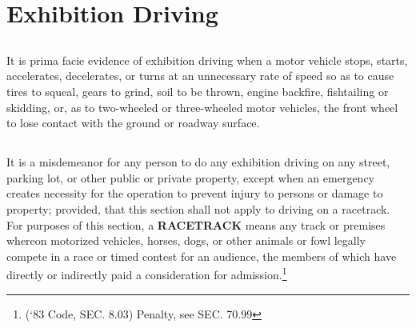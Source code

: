 \section{Exhibition Driving}
\subsection{}
It is prima facie evidence of exhibition driving when a motor vehicle stops, starts, accelerates, decelerates, or turns at an unnecessary rate of speed so as to cause tires to squeal, gears to grind, soil to be thrown, engine backfire, fishtailing or skidding, or, as to two-wheeled or three-wheeled motor vehicles, the front wheel to lose contact with the ground or roadway surface.
\subsection{}
It is a misdemeanor for any person to do any exhibition driving on any street, parking lot, or other public or private property, except when an emergency creates necessity for the operation to prevent injury to persons or damage to property; provided, that this section shall not apply to driving on a racetrack.  For purposes of this section, a \textbf{RACETRACK} means any track or premises whereon motorized vehicles, horses, dogs, or other animals or fowl legally compete in a race or timed contest for an audience, the members of which have directly or indirectly paid a consideration for admission.\footnote{(‘83 Code, SEC. 8.03) Penalty, see SEC. 70.99}\\


\setcounter{section}{14}
